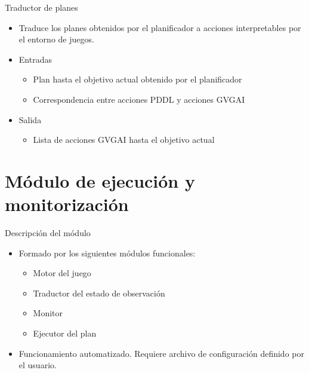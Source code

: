 \documentclass[11pt]{beamer}    %
\begin{document}
    \begin{frame}{Traductor de planes}
        \begin{itemize}
            \item Traduce los planes obtenidos por el planificador a acciones interpretables
            por el entorno de juegos.
            \item \alert{Entradas}
            \begin{itemize}
                \item Plan hasta el objetivo actual obtenido por el planificador
                \item Correspondencia entre acciones PDDL y acciones GVGAI
            \end{itemize}
            \item \alert{Salida}
            \begin{itemize}
                \item Lista de acciones GVGAI hasta el objetivo actual
            \end{itemize}
        \end{itemize}
    \end{frame}

    \section{Módulo de ejecución y monitorización}

    \begin{frame}{Descripción del módulo}
        \begin{itemize}
            \item Formado por los siguientes módulos funcionales:

            \begin{itemize}
                \item Motor del juego
                \item Traductor del estado de observación
                \item Monitor
                \item Ejecutor del plan
            \end{itemize}
            \item Funcionamiento automatizado. Requiere archivo de configuración definido
            por el usuario.
        \end{itemize}
    \end{frame}
\end{document}
